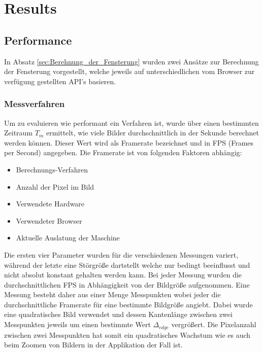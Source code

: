 
\section{Results}
\label{sec:results}

\subsection{Performance}
\label{sec:Performance}

In Absatz \ref{sec:Berehnung_der_Fensterung} wurden zwei Ansätze zur Berechnung der Fensterung vorgestellt,
welche jeweils auf unterschiedlichen vom Browser zur verfügung gestellten API's basieren.

\subsubsection{Messverfahren}
Um zu evaluieren wie performant ein Verfahren ist,
wurde über einen bestimmten Zeitraum $T_m$ ermittelt, wie viele Bilder durchschnittlich in der Sekunde berechnet werden können.
Dieser Wert wird als Framerate bezeichnet und in FPS (Frames per Second) angegeben.
Die Framerate ist von folgenden Faktoren abhängig:
\begin{itemize}
	\item Berechnungs-Verfahren
	\item Anzahl der Pixel im Bild
	\item Verwendete Hardware
	\item Verwendeter Browser
	\item Aktuelle Auslatung der Maschine
\end{itemize}
Die ersten vier Parameter wurden für die verschiedenen Messungen variert, während der letzte eine Störgröße dartstellt welche nur bedingt beeinflusst und nicht absolut konstant gehalten werden kann.
Bei jeder Messung wurden die durchschnittlichen FPS in Abhängigkeit von der Bildgröße aufgenommen.
Eine Messung besteht daher aus einer Menge Messpunkten wobei jeder die durchschnittliche Framerate für eine bestimmte Bildgröße angiebt.
Dabei wurde eine quadratisches Bild verwendet und dessen Kantenlänge zwischen zwei Messpunkten jeweils um einen bestimmte Wert $\Delta_{edge}$ vergrößert.
Die Pixelanzahl zwischen zwei Messpunkten hat somit ein quadratisches Wachstum wie es auch beim Zoomen von Bildern in der Applikation der Fall ist.

